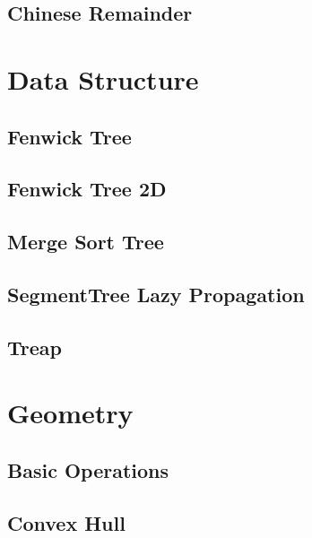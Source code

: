 \documentclass[10pt,landscape,a4paper,twocolumn]{article}
\begin{document}
\subsection{Chinese Remainder}




\section{Data Structure}
\subsection{Fenwick Tree}


\subsection{Fenwick Tree 2D}


\subsection{Merge Sort Tree}


\subsection{SegmentTree Lazy Propagation}


\subsection{Treap}



\section{Geometry}
\subsection{Basic Operations}


\subsection{Convex Hull}

\end{document}
